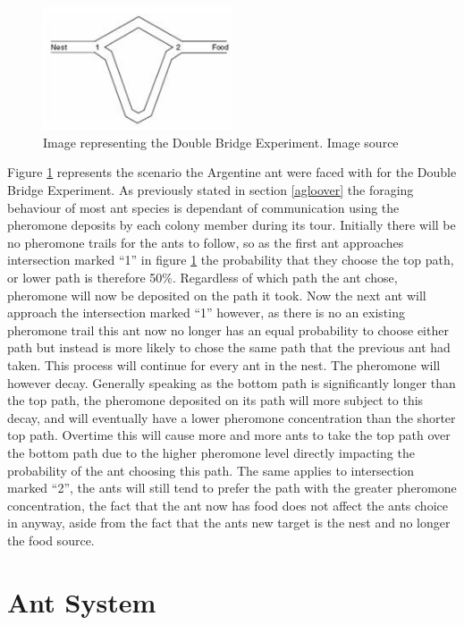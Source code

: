 \begin{figure}[h!]
\centering
\includegraphics[width=0.5\textwidth]{Images/chapter1/doublebridge}
\caption{Image representing the Double Bridge Experiment. Image source \cite{doublebridges:image}}
\label{fig:doublebridge}
\end{figure}

\noindent
Figure \ref{fig:doublebridge} represents the scenario the Argentine ant were faced with for the Double Bridge Experiment. As previously stated in section \ref{agloover} the foraging behaviour of most ant species is dependant of communication using the pheromone deposits by each colony member during its tour. Initially there will be no pheromone trails for the ants to follow, so as the first ant approaches intersection marked \enquote{1} in figure \ref{fig:doublebridge} the probability that they choose the top path, or lower path is therefore 50\%. Regardless of which path the ant chose, pheromone will now be deposited on the path it took. Now the next ant will approach the intersection marked \enquote{1} however, as there is no an existing pheromone trail this ant now no longer has an equal probability to choose either path but instead is more likely to chose the same path that the previous ant had taken. This process will continue for every ant in the nest. The pheromone will however decay. Generally speaking as the bottom path is significantly longer than the top path, the pheromone deposited on its path will more subject to this decay, and will eventually have a lower pheromone concentration than the shorter top path. Overtime this will cause more and more ants to take the top path over the bottom path due to the higher pheromone level directly impacting the probability of the ant choosing this path. The same applies to intersection marked \enquote{2}, the ants will still tend to prefer the path with the greater pheromone concentration, the fact that the ant now has food does not affect the ants choice in anyway, aside from the fact that the ants new target is the nest and no longer the food source.

\section{Ant System}

